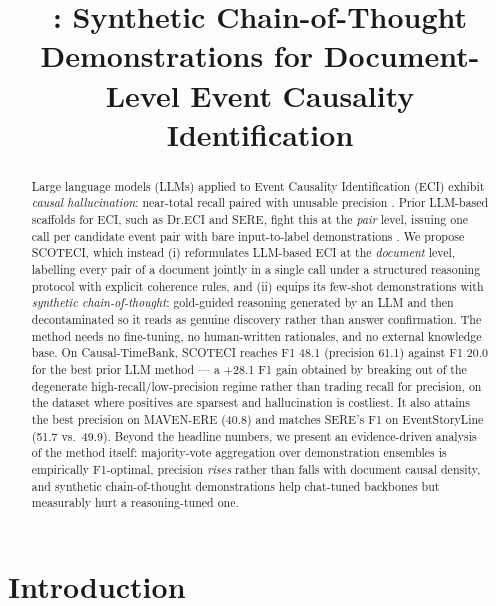 \documentclass[11pt]{article}
\title{\method{}: Synthetic Chain-of-Thought Demonstrations for Document-Level Event Causality Identification\\
{\normalsize \todo{working title --- alternatives: ``Documents, not Pairs: ...'' / ``Rationalized Few-Shot Prompting for Document-Level ECI''}}}
\author{}
\date{}
\newcommand{\method}{SCOTECI}
\begin{document}
\maketitle

\begin{abstract}
Large language models (LLMs) applied to Event Causality Identification (ECI) exhibit
\emph{causal hallucination}: near-total recall paired with unusable precision
\citep{gao2023chatgpt}. Prior LLM-based scaffolds for ECI, such as Dr.ECI and SERE,
fight this at the \emph{pair} level, issuing one call per candidate event pair with
bare input-to-label demonstrations \citep{cai2025dreci, hao2026sere}. We propose
\method{}, which instead (i) reformulates LLM-based ECI at the \emph{document} level,
labelling every pair of a document jointly in a single call under a structured
reasoning protocol with explicit coherence rules, and (ii) equips its few-shot
demonstrations with \emph{synthetic chain-of-thought}: gold-guided reasoning generated
by an LLM and then decontaminated so it reads as genuine discovery rather than answer
confirmation. The method needs no fine-tuning, no human-written rationales, and no
external knowledge base. On Causal-TimeBank, \method{} reaches F1 48.1 (precision
61.1) against F1 20.0 for the best prior LLM method --- a +28.1 F1 gain obtained by
breaking out of the degenerate high-recall/low-precision regime rather than trading
recall for precision, on the dataset where positives are sparsest and hallucination is
costliest. It also attains the best precision on MAVEN-ERE (40.8) and matches SERE's
F1 on EventStoryLine (51.7 vs.\ 49.9). Beyond the headline numbers, we present an
evidence-driven analysis of the method itself: majority-vote aggregation over
demonstration ensembles is empirically F1-optimal, precision \emph{rises} rather than
falls with document causal density, and synthetic chain-of-thought demonstrations help
chat-tuned backbones but measurably hurt a reasoning-tuned one.
\end{abstract}

\section{Introduction}
\label{sec:intro}
\end{document}
